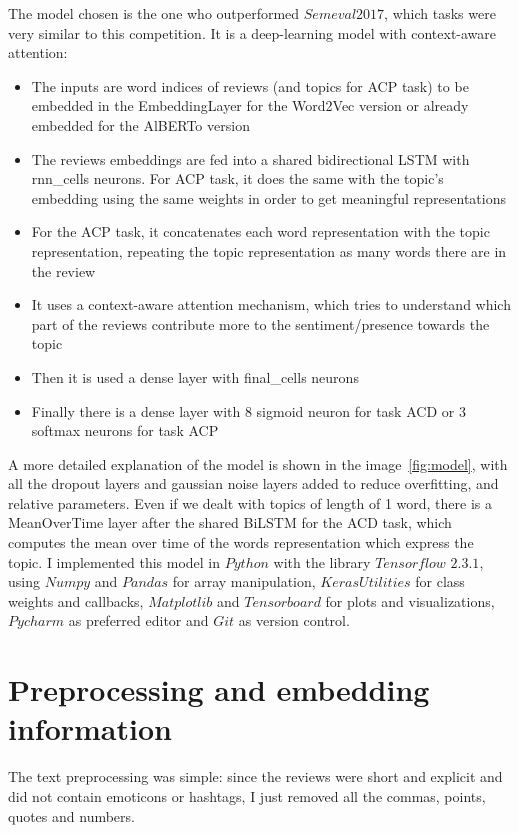\documentclass{article}
\begin{document}
        The model chosen is the one who outperformed $Semeval2017$, which tasks were very similar to this competition.
        It is a deep-learning model with context-aware attention:
        \begin{itemize}
            \item The inputs are word indices of reviews (and topics for ACP task) to be embedded in the EmbeddingLayer for the Word2Vec version or already embedded for the AlBERTo version
            \item The reviews embeddings are fed into a shared bidirectional LSTM with rnn\_cells neurons.
                For ACP task, it does the same with the topic's embedding using the same weights in order to get meaningful representations
            \item For the ACP task, it concatenates each word representation with the topic representation, repeating the topic representation as many words there are in the review
            \item It uses a context-aware attention mechanism, which tries to understand which part of the reviews contribute more to the sentiment/presence towards the topic
            \item Then it is used a dense layer with final\_cells neurons
            \item Finally there is a dense layer with 8 sigmoid neuron for task ACD or 3 softmax neurons for task ACP
        \end{itemize}
        A more detailed explanation of the model is shown in the image~\ref{fig:model}, with all the dropout layers and gaussian noise layers added to reduce overfitting, and relative parameters.
        Even if we dealt with topics of length of 1 word, there is a MeanOverTime layer after the shared BiLSTM for the ACD task, which computes the mean over time of the words representation which express the topic.
        I implemented this model in $Python$ with the library $Tensorflow$ $2.3.1$, using $Numpy$ and $Pandas$ for array manipulation, $Keras Utilities$ for class weights and callbacks, $Matplotlib$ and $Tensorboard$ for plots and visualizations, $Pycharm$ as preferred editor and $Git$ as version control.
    \section{Preprocessing and embedding information}\label{sec:preprocessing-and-embedding-information}
        The text preprocessing was simple: since the reviews were short and explicit and did not contain emoticons or hashtags, I just removed all the commas, points, quotes and numbers.
\end{document}
